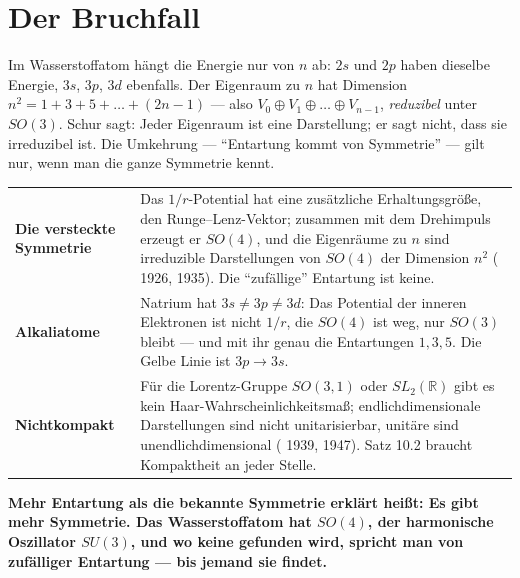 \section{Der Bruchfall}

\begin{warnung}
Im Wasserstoffatom hängt die Energie nur von $n$ ab: $2s$ und $2p$ haben dieselbe Energie, $3s$, $3p$, $3d$ ebenfalls. Der Eigenraum zu $n$ hat Dimension $n^{2} = 1 + 3 + 5 + \dots + (2n - 1)$ --- also $V_0\oplus V_1\oplus\dots\oplus V_{n-1}$, \emph{reduzibel} unter $SO(3)$. Schur sagt: Jeder Eigenraum ist eine Darstellung; er sagt nicht, dass sie irreduzibel ist. Die Umkehrung --- \enquote{Entartung kommt von Symmetrie} --- gilt nur, wenn man die ganze Symmetrie kennt.

\begin{center}
{\small
\renewcommand{\arraystretch}{1.5}
\begin{tabular}{@{}P{3.2cm}P{5.4cm}@{}}
\toprule
\textbf{Die versteckte Symmetrie} & Das $1/r$-Potential hat eine zusätzliche Erhaltungsgröße, den Runge--Lenz-Vektor; zusammen mit dem Drehimpuls erzeugt er $SO(4)$, und die Eigenräume zu $n$ sind irreduzible Darstellungen von $SO(4)$ der Dimension $n^{2}$ ( 1926,  1935). Die \enquote{zufällige} Entartung ist keine.\\
\textbf{Alkaliatome} & Natrium hat $3s\neq3p\neq3d$: Das Potential der inneren Elektronen ist nicht $1/r$, die $SO(4)$ ist weg, nur $SO(3)$ bleibt --- und mit ihr genau die Entartungen $1, 3, 5$. Die Gelbe Linie ist $3p\to3s$.\\
\textbf{Nichtkompakt} & Für die Lorentz-Gruppe $SO(3, 1)$ oder $SL_2(\mathbb R)$ gibt es kein Haar-Wahrscheinlichkeitsmaß; endlichdimensionale Darstellungen sind nicht unitarisierbar, unitäre sind unendlichdimensional ( 1939,  1947). Satz 10.2 braucht Kompaktheit an jeder Stelle.\\
\bottomrule
\end{tabular}}
\end{center}

\begin{center}
\begin{minipage}{0.9\textwidth}
\textbf{Mehr Entartung als die bekannte Symmetrie erklärt heißt: Es gibt mehr Symmetrie. Das Wasserstoffatom hat $SO(4)$, der harmonische Oszillator $SU(3)$, und wo keine gefunden wird, spricht man von zufälliger Entartung --- bis jemand sie findet.}
\end{minipage}
\end{center}
\end{warnung}

